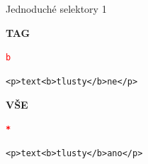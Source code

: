 \documentclass[aspectratio=1610]{beamer}
\begin{document}
\begin{frame}{Jednoduché selektory 1}
    \begin{multicols}{2}
        \centering

        \begin{cardTiny}
            \begin{center}
                \textbf{TAG}
            \end{center}

            \begin{flushleft}
                \begin{alltt}
                    \textcolor{red}{b} \string{\\
                        \textcolor{blue}{color}: \textcolor{orange}{blue};\\
                    \string}
                \end{alltt}
                \begin{alltt}
                    <p>text <b>tlusty</b> ne</p>
                \end{alltt}
            \end{flushleft}
        \end{cardTiny}
        \begin{cardTiny}
            \begin{center}
                \textbf{VŠE}
            \end{center}

            \begin{flushleft}
                \begin{alltt}
                    \textbf{\textcolor{red}{*}} \string{\\
                        \textcolor{blue}{color}: \textcolor{orange}{purple};\\
                    \string}
                \end{alltt}

                \begin{alltt}
                    <p>text <b>tlusty</b> ano</p>
                \end{alltt}
            \end{flushleft}
        \end{cardTiny}
    \end{multicols}
\end{frame}
\end{document}
